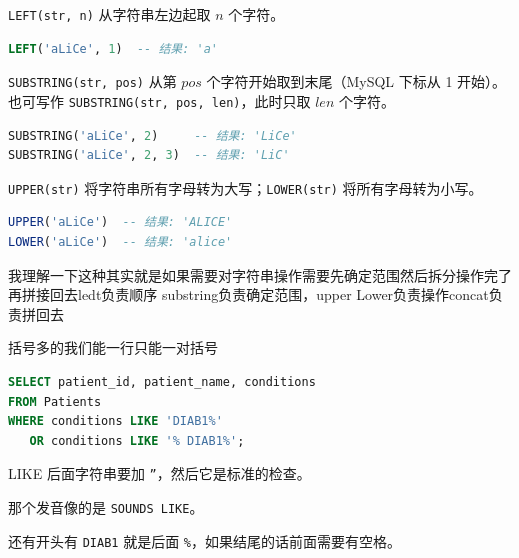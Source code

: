 \begin{definition}[LEFT 函数]
\texttt{LEFT(str, n)} 从字符串左边起取 $n$ 个字符。

\begin{lstlisting}[language=SQL, frame=single, backgroundcolor=\color{white}]
LEFT('aLiCe', 1)  -- 结果: 'a'
\end{lstlisting}
\end{definition}

\begin{definition}[SUBSTRING 函数]
\texttt{SUBSTRING(str, pos)} 从第 $pos$ 个字符开始取到末尾（MySQL 下标从 1 开始）。也可写作 \texttt{SUBSTRING(str, pos, len)}，此时只取 $len$ 个字符。

\begin{lstlisting}[language=SQL, frame=single, backgroundcolor=\color{white}]
SUBSTRING('aLiCe', 2)     -- 结果: 'LiCe'
SUBSTRING('aLiCe', 2, 3)  -- 结果: 'LiC'
\end{lstlisting}
\end{definition}

\begin{definition}
\texttt{UPPER(str)} 将字符串所有字母转为大写；\texttt{LOWER(str)} 将所有字母转为小写。

\begin{lstlisting}[language=SQL, frame=single, backgroundcolor=\color{white}]
UPPER('aLiCe')  -- 结果: 'ALICE'
LOWER('aLiCe')  -- 结果: 'alice'
\end{lstlisting}
\end{definition}

\begin{homework}[1667 | 高级字符串函数 第1题]
\begin{dxtips}
    我理解一下这种其实就是如果需要对字符串操作需要先确定范围然后拆分操作完了再拼接回去ledt负责顺序
    substring负责确定范围，upper Lower负责操作concat负责拼回去
\end{dxtips}

\begin{dxtips}
    括号多的我们能一行只能一对括号
\end{dxtips}
\end{homework}

\begin{homework}[1527 | 高级字符串函数 第2题]
\begin{lstlisting}[language=SQL]
SELECT patient_id, patient_name, conditions
FROM Patients
WHERE conditions LIKE 'DIAB1%'
   OR conditions LIKE '% DIAB1%';
\end{lstlisting}
\begin{dxtips}
   LIKE 后面字符串要加 \texttt{''}，然后它是标准的检查。

那个发音像的是 \texttt{SOUNDS LIKE}。

还有开头有 \texttt{DIAB1} 就是后面 \texttt{\%}，如果结尾的话前面需要有空格。
\end{dxtips}
\end{homework}

